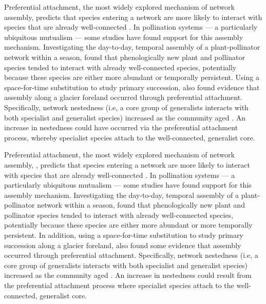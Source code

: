 \documentclass[12pt]{article}
\begin{document}

Preferential attachment, the most widely explored mechanism of network
assembly, predicts that species entering a network are more likely to
interact with species that are already well-connected \citep[the
``rich-get-richer'' principle,][]{barabasi1999emergence}. In
pollination systems --- a particularly ubiquitous mutualism
\citep{ollerton-2011-321, klein-2007-303} --- some studies have found
support for this assembly mechanism. Investigating the day-to-day,
temporal assembly of a plant-pollinator network within a season,
\cite{Olesen2008} found that phenologically new plant and pollinator
species tended to interact with already well-connected species,
potentially because these species are either more abundant or
temporally persistent. Using a space-for-time substitution to study
primary succession, \cite{albrecht2010plant} also found evidence that
assembly along a glacier foreland occurred through preferential
attachment. Specifically, network nestedness (i.e, a core group of
generalists interacts with both specialist and generalist species)
increased as the community aged \citep{albrecht2010plant}. An increase
in nestedness could have occurred via the preferential attachment
process, whereby specialist species attach to the well-connected,
generalist core.

Preferential attachment, the most widely explored mechanism of network
assembly, \citep{barabasi1999emergence}, predicts that species
entering a network are more likely to interact with species that are
already well-connected \citep[the ``rich-get-richer''
principle,][]{barabasi1999emergence}. In pollination systems --- a
particularly ubiquitous mutualism \citep{ollerton-2011-321,
  klein-2007-303} --- some studies have found support for this
assembly mechanism. Investigating the day-to-day, temporal assembly of
a plant-pollinator network within a season, \cite{Olesen2008} found
that phenologically new plant and pollinator species tended to
interact with already well-connected species, potentially because
these species are either more abundant or more temporally
persistent. In addition, using a space-for-time substitution to study
primary succession along a glacier foreland, \cite{albrecht2010plant}
also found some evidence that assembly occurred through preferential
attachment. Specifically, network nestedness (i.e, a core group of
generalists interacts with both specialist and generalist species)
increased as the community aged \citep{albrecht2010plant}. An
increase in nestedness could result from the preferential attachment
process where specialist species attach to the well-connected,
generalist core.
\end{document}
